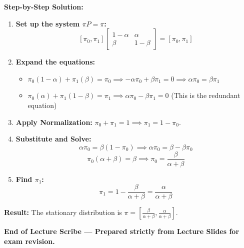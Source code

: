 \documentclass[11pt]{article}
\begin{document}
\textbf{Step-by-Step Solution:}
\begin{enumerate}
    \item \textbf{Set up the system $\pi P = \pi$:}
    \[ [\pi_0, \pi_1] \begin{bmatrix} 1-\alpha & \alpha \\ \beta & 1-\beta \end{bmatrix} = [\pi_0, \pi_1] \]
    \item \textbf{Expand the equations:}
    \begin{itemize}
        \item $\pi_0(1-\alpha) + \pi_1(\beta) = \pi_0 \implies -\alpha\pi_0 + \beta\pi_1 = 0 \implies \alpha\pi_0 = \beta\pi_1$
        \item $\pi_0(\alpha) + \pi_1(1-\beta) = \pi_1 \implies \alpha\pi_0 - \beta\pi_1 = 0$ (This is the redundant equation)
    \end{itemize}
    \item \textbf{Apply Normalization:} $\pi_0 + \pi_1 = 1 \implies \pi_1 = 1 - \pi_0$.
    \item \textbf{Substitute and Solve:}
    \[ \alpha\pi_0 = \beta(1-\pi_0) \implies \alpha\pi_0 = \beta - \beta\pi_0 \]
    \[ \pi_0(\alpha + \beta) = \beta \implies \pi_0 = \frac{\beta}{\alpha + \beta} \]
    \item \textbf{Find $\pi_1$:}
    \[ \pi_1 = 1 - \frac{\beta}{\alpha + \beta} = \frac{\alpha}{\alpha + \beta} \]
\end{enumerate}
\textbf{Result:} The stationary distribution is $\pi = \left[ \frac{\beta}{\alpha + \beta}, \frac{\alpha}{\alpha + \beta} \right]$.

\vfill
\noindent \textbf{End of Lecture Scribe --- Prepared strictly from Lecture Slides for exam revision.}
\end{document}
